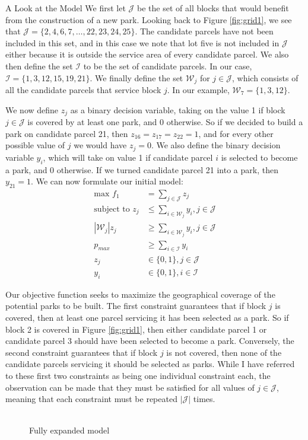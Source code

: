 \documentclass[12pt]{pom_thesis}
\theoremstyle{definition}
\begin{document}
\begin{chapter}{A Look at the Model}
	We first let $\mathcal{J}$ be the set of all blocks that would benefit from the construction of a new park. Looking back to Figure \ref{fig:grid1}, we see that $\mathcal{J} = \{ 2,4,6,7, \dots, 22, 23, 24, 25\}$. The candidate parcels have not been included in this set, and in this case we note that lot five is not included in $\mathcal{J}$ either because it is outside the service area of every candidate parcel. We also then define the set $\mathcal{I}$ to be the set of candidate parcels. In our case, $\mathcal{I} = \{ 1,3,12,15,19,21\}$. We finally define the set $\mathcal{W}_j$ for $j \in \mathcal{J}$, which consists of all the candidate parcels that service block $j$. In our example, $\mathcal{W}_7 = \{1,3,12\}$. \newline
	
	We now define $z_j$ as a binary decision variable, taking on the value 1 if block $j \in \mathcal{J}$ is covered by at least one park, and 0 otherwise. So if we decided to build a park on candidate parcel 21, then $z_{16} = z_{17} = z_{22} = 1$, and for every other possible value of $j$ we would have $z_j = 0$. We also define the binary decision variable $y_i$, which will take on value 1 if candidate parcel $i$ is selected to become a park, and 0 otherwise. If we turned candidate parcel 21 into a park, then $y_{21} = 1$. We can now formulate our initial model:
\begin{align*}
\textrm{max } f_1 &= \sum_{j \in \mathcal{J}} z_j \\
\textrm{subject to } z_j &\leq \sum_{i \in \mathcal{W}_j} y_i, j \in \mathcal{J}\\
\left|\mathcal{W}_j\right|z_j &\geq \sum_{i \in \mathcal{W}_j} y_i, j \in \mathcal{J} \\
p_{max} &\geq \sum_{i \in \mathcal{I}} y_i \\
z_j &\in \{0,1\}, j \in \mathcal{J} \\
y_i &\in \{0,1\}, i \in \mathcal{I}
\end{align*}

	Our objective function seeks to maximize the geographical coverage of the potential parks to be built. The first constraint guarantees that if block $j$ is covered, then at least one parcel servicing it has been selected as a park. So if block 2 is covered in Figure \ref{fig:grid1}, then either candidate parcel 1 or candidate parcel 3 should have been selected to become a park. Conversely, the second constraint guarantees that if block $j$ is not covered, then none of the candidate parcels servicing it should be selected as parks. While I have referred to these first two constraints as being one individual constraint each, the observation can be made that they must be satisfied for all values of $j \in \mathcal{J}$, meaning that each constraint must be repeated $|\mathcal{J}|$ times. \\ \\
	\begin{figure}
	\centering
	\caption{Fully expanded model}
	\label{expandedmodel}
	

\end{figure}
\end{chapter}
\end{document}
